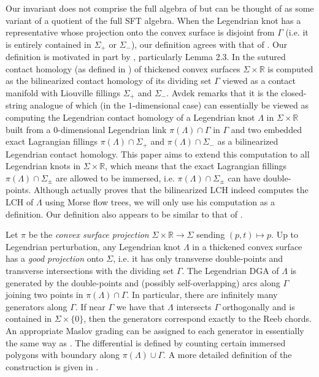 \documentclass[11pt]{amsart}
\theoremstyle{mystyle}
\newcommand{\R}{\mathbb{R}}
\newcommand{\<}{\langle}
\renewcommand{\>}{\rangle}
\begin{document}
Our invariant does not comprise the full algebra of \cite{egh2000SFT} but can be thought of as some variant of a quotient of the full SFT algebra. When the Legendrian knot has a representative whose projection onto the convex surface is disjoint from $\Gamma$ (i.e. it is entirely contained in $\Sigma_+$ or $\Sigma_-$), our definition agrees with that of \cite{ekholm2007PxR}. Our definition is motivated in part by \cite{ekholm2016nonloose}, particularly Lemma 2.3. In \cite{avdek2023algebraicgiroux} the sutured contact homology (as defined in \cite{CGHH2011suturedcontacthomology}) of thickened convex surfaces $\Sigma \times \R$ is computed as the bilinearized contact homology of its dividing set $\Gamma$ viewed as a contact manifold with Liouville fillings $\Sigma_+$ and $\Sigma_-$. Avdek remarks that it is the closed-string analogue of \cite{ekholm2016nonloose} which (in the $1$-dimensional case) can essentially be viewed as computing the Legendrian contact homology of a Legendrian knot $\Lambda$ in $\Sigma \times \R$ built from a $0$-dimensional Legendrian link $\pi(\Lambda) \cap \Gamma$ in $\Gamma$ and two embedded exact Lagrangian fillings $\pi(\Lambda) \cap \Sigma_+$ and $\pi(\Lambda) \cap \Sigma_-$ as a bilinearized Legendrian contact homology. This paper aims to extend this computation to all Legendrian knots in $\Sigma \times \R$, which means that the exact Lagrangian fillings $\pi(\Lambda) \cap \Sigma_\pm$ are allowed to be immersed, i.e. $\pi(\Lambda) \cap \Sigma_\pm$ can have double-points. Although \cite{ekholm2016nonloose} actually proves that the bilinearized LCH indeed computes the LCH of $\Lambda$ using Morse flow trees, we will only use his computation as a definition. Our definition also appears to be similar to that of \cite{sivek2011bordered} \cite{pan2021functorial}. 

Let $\pi$ be the \textit{convex surface projection} $\Sigma \times \R \rightarrow \Sigma$ sending $(p, t) \mapsto p$. Up to Legendrian perturbation, any Legendrian knot $\Lambda$ in a thickened convex surface has a \textit{good projection} onto $\Sigma$, i.e. it has only transverse double-points and transverse intersections with the dividing set $\Gamma$. The Legendrian DGA of $\Lambda$ is generated by the double-points and (possibly self-overlapping) arcs along $\Gamma$ joining two points in $\pi(\Lambda) \cap \Gamma$. In particular, there are infinitely many generators along $\Gamma$. If near $\Gamma$ we have that $\Lambda$ intersects $\Gamma$ orthogonally and is contained in $\Sigma \times \{0\}$, then the generators correspond exactly to the Reeb chords. An appropriate Maslov grading can be assigned to each generator in essentially the same way as \cite{licata2013seifert}. The differential is defined by counting certain immersed polygons with boundary along $\pi(\Lambda) \cup \Gamma$. A more detailed definition of the construction is given in .
\end{document}
